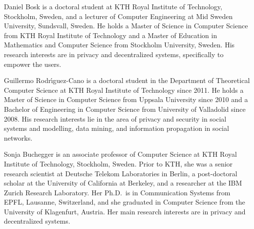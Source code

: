 \documentclass[a4paper]{llncs}
\begin{document}
Daniel Bosk is a doctoral student at KTH Royal Institute of Technology, 
Stockholm, Sweden, and a lecturer of Computer Engineering at Mid Sweden 
University, Sundsvall, Sweden.
He holds a Master of Science in Computer Science from KTH Royal Institute of 
Technology and a Master of Education in Mathematics and Computer Science from 
Stockholm University, Sweden.
His research interests are in privacy and decentralized systems, specifically 
to empower the users.

Guillermo Rodr\'{\i}guez-Cano is a doctoral student in the Department of 
Theoretical Computer Science at KTH Royal Institute of Technology since 2011.
He holds a Master of Science in Computer Science from Uppsala University since 
2010 and a Bachelor of Engineering in Computer Science from University of 
Valladolid since 2008.
His research interests lie in the area of privacy and security in social 
systems and modelling, data mining, and information propagation in social 
networks.

Sonja Buchegger is an associate professor of Computer Science at KTH Royal 
Institute of Technology, Stockholm, Sweden.
Prior to KTH, she was a
senior research scientist at Deutsche Telekom Laboratories in Berlin,
a post-doctoral scholar at the University of California at Berkeley,
and a researcher at the IBM Zurich Research Laboratory.
Her Ph.D.\ is in Communication Systems from EPFL, Lausanne, Switzerland, and 
she graduated in Computer Science from the University of Klagenfurt, Austria.
Her main research interests are in privacy and decentralized systems.
\end{document}
